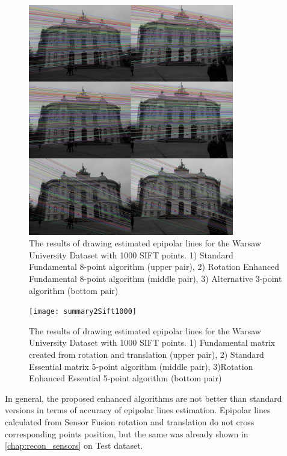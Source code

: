 \begin{figure}[b!]
    \centering
    \includegraphics[width=0.8\textwidth]{summary1Sift1000}
    \caption[The results of drawing estimated epipolar lines for the Warsaw University Dataset with 1000 SIFT points (1st group)]{The results of drawing estimated epipolar lines for the Warsaw University Dataset with 1000 SIFT points. 1) Standard Fundamental 8-point algorithm (upper pair), 2) Rotation Enhanced Fundamental 8-point algorithm (middle pair), 3) Alternative 3-point algorithm (bottom pair) }
    \label{fig:SummaryEpiLines11000}
\end{figure}
\begin{figure}[ht!]
    \centering
    \texttt{[image: summary2Sift1000]}
    \caption[The results of drawing estimated epipolar lines for the Warsaw University Dataset with 1000 SIFT points (2nd group)]{The results of drawing estimated epipolar lines for the Warsaw University Dataset with 1000 SIFT points. 1) Fundamental matrix created from rotation and translation (upper pair), 2) Standard Essential matrix 5-point algorithm (middle pair), 3)Rotation Enhanced Essential 5-point algorithm (bottom pair) }
    \label{fig:SummaryEpiLines21000}
\end{figure}
In general, the proposed enhanced algorithms are not better than standard versions in terms of accuracy of epipolar lines estimation. Epipolar lines calculated from Sensor Fusion rotation and translation do not cross corresponding points position, but the same was already shown in \ref{chap:recon_sensors} on Test dataset.
\clearpage
